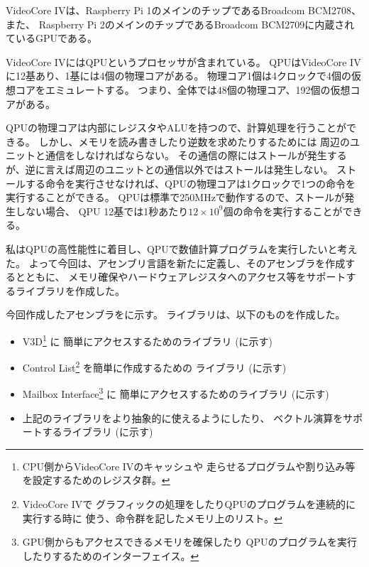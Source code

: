 \def \wrkdir {p.vc4/}

\label{pa:vc4}

VideoCore IVは、Raspberry Pi 1のメインのチップであるBroadcom BCM2708、また、
Raspberry Pi 2のメインのチップであるBroadcom BCM2709に内蔵されているGPUである。

VideoCore IVにはQPUというプロセッサが含まれている。
QPUはVideoCore IVに12基あり、1基には4個の物理コアがある。
物理コア1個は4クロックで4個の仮想コアをエミュレートする。
つまり、全体では48個の物理コア、192個の仮想コアがある。

QPUの物理コアは内部にレジスタやALUを持つので、計算処理を行うことができる。
しかし、メモリを読み書きしたり逆数を求めたりするためには
周辺のユニットと通信をしなければならない。
その通信の際にはストールが発生するが、逆に言えば周辺のユニットとの通信以外ではストールは発生しない。
ストールする命令を実行させなければ、QPUの物理コアは1クロックで1つの命令を実行することができる。
QPUは標準で250MHzで動作するので、ストールが発生しない場合、
QPU 12基では1秒あたり$12 \times 10^9$個の命令を実行することができる。

私はQPUの高性能性に着目し、QPUで数値計算プログラムを実行したいと考えた。
よって今回は、アセンブリ言語を新たに定義し、そのアセンブラを作成するとともに、
メモリ確保やハードウェアレジスタへのアクセス等をサポートするライブラリを作成した。

今回作成したアセンブラを\cite{bib:qtc}に示す。
ライブラリは、以下のものを作成した。
\begin{itemize}
\item V3D\footnote{CPU側からVideoCore IVのキャッシュや
	走らせるプログラムや割り込み等を設定するためのレジスタ群。} に
	簡単にアクセスするためのライブラリ (\cite{bib:libvc4v3d}に示す)
\item Control List\footnote{VideoCore IVで
	グラフィックの処理をしたりQPUのプログラムを連続的に実行する時に
	使う、命令群を記したメモリ上のリスト。} を簡単に作成するための
	ライブラリ (\cite{bib:libvc4clist}に示す)
\item Mailbox Interface\footnote{GPU側からもアクセスできるメモリを確保したり
	QPUのプログラムを実行したりするためのインターフェイス。} に
	簡単にアクセスするためのライブラリ (\cite{bib:mailbox}に示す)
\item 上記のライブラリをより抽象的に使えるようにしたり、
	ベクトル演算をサポートするライブラリ (\cite{bib:libvc4vec}に示す)
\end{itemize}
